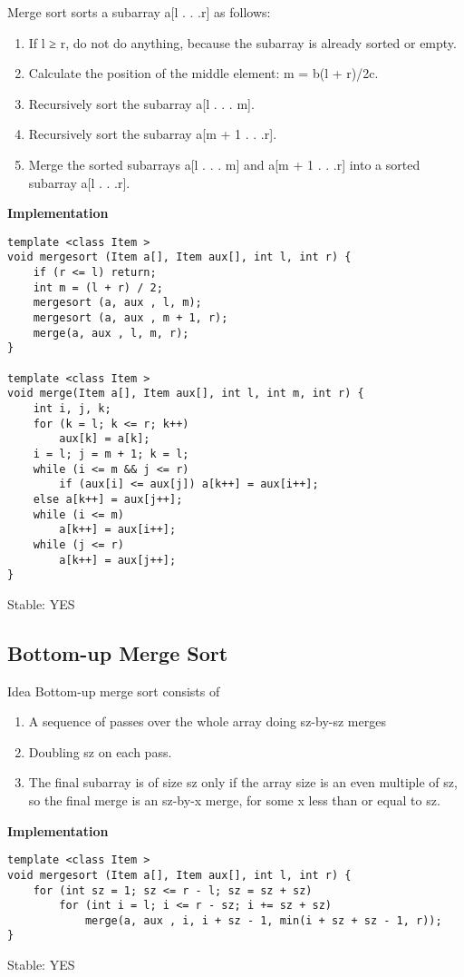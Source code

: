 \documentclass{article}
\begin{document}
Merge sort sorts a subarray a[l . . .r] as follows:
\begin{enumerate}
\item If l ≥ r, do not do anything, because the subarray is already sorted or empty.
\item Calculate the position of the middle element: m = b(l + r)/2c.
\item Recursively sort the subarray a[l . . . m].
\item Recursively sort the subarray a[m + 1 . . .r].
\item Merge the sorted subarrays a[l . . . m] and a[m + 1 . . .r] into a sorted subarray a[l . . .r].
\end{enumerate}
\textbf{Implementation}
\begin{verbatim}
template <class Item >
void mergesort (Item a[], Item aux[], int l, int r) {
    if (r <= l) return;
    int m = (l + r) / 2;
    mergesort (a, aux , l, m);
    mergesort (a, aux , m + 1, r);
    merge(a, aux , l, m, r);
}

template <class Item >
void merge(Item a[], Item aux[], int l, int m, int r) {
    int i, j, k;
    for (k = l; k <= r; k++)
        aux[k] = a[k];
    i = l; j = m + 1; k = l;
    while (i <= m && j <= r)
        if (aux[i] <= aux[j]) a[k++] = aux[i++];
    else a[k++] = aux[j++];
    while (i <= m)
        a[k++] = aux[i++];
    while (j <= r)
        a[k++] = aux[j++];
}
\end{verbatim}
Stable: YES


\subsection{Bottom-up Merge Sort}
Idea
Bottom-up merge sort consists of
\begin{enumerate}
    \item A sequence of passes over the whole array doing sz-by-sz merges
    \item Doubling sz on each pass.
    \item The final subarray is of size sz only if the array size is an even multiple of sz, so the final merge is an sz-by-x merge, for some x less than or equal to sz.
\end{enumerate}

\textbf{Implementation}
\begin{verbatim}
template <class Item >
void mergesort (Item a[], Item aux[], int l, int r) {
    for (int sz = 1; sz <= r - l; sz = sz + sz)
        for (int i = l; i <= r - sz; i += sz + sz)
            merge(a, aux , i, i + sz - 1, min(i + sz + sz - 1, r));
}
\end{verbatim}
Stable: YES
\end{document}
